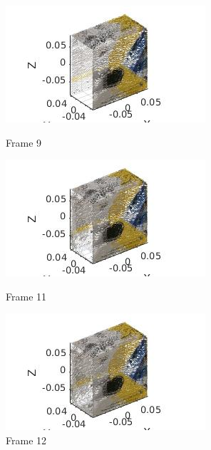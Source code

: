 \documentclass[10pt,a4paper]{article}
\begin{document}
\vspace{-30pt}
\hspace{-40pt}
\begin{figure}[!h]
	\begin{minipage}[t]{0.33 \linewidth}
		
		\centering
		\includegraphics[scale=0.5]{box/9.jpg}
		\caption{ \small Frame 9}
	\end{minipage}
	\begin{minipage}[t]{0.33 \linewidth}
		\centering
		\includegraphics[scale=0.5]{box/11.jpg}
		\caption{ \small Frame 11}
	\end{minipage}
	\begin{minipage}[t]{0.33 \linewidth}
		\centering
		\includegraphics[scale=0.5]{box/12.jpg}
		\caption{ \small Frame 12}
	\end{minipage}
\end{figure}
\end{document}
